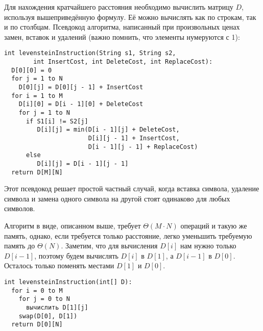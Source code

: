 Для нахождения кратчайшего расстояния необходимо вычислить матрицу $D$, используя вышеприведённую формулу.
Её можно вычислять как по строкам, так и по столбцам.
Псевдокод алгоритма, написанный при произвольных ценах замен, вставок и удалений (важно помнить, что элементы нумеруются с 1):

\begin{verbatim}
int levensteinInstruction(String s1, String s2, 
		int InsertCost, int DeleteCost, int ReplaceCost):
  D[0][0] = 0
  for j = 1 to N
    D[0][j] = D[0][j - 1] + InsertCost                  
  for i = 1 to M
    D[i][0] = D[i - 1][0] + DeleteCost                  
    for j = 1 to N
      if S1[i] != S2[j] 
         D[i][j] = min(D[i - 1][j] + DeleteCost,        
                       D[i][j - 1] + InsertCost,                      
                       D[i - 1][j - 1] + ReplaceCost)                 
      else 
         D[i][j] = D[i - 1][j - 1]
  return D[M][N]
\end{verbatim}

Этот псевдокод решает простой частный случай, когда вставка символа, удаление символа и замена одного символа на другой стоят одинаково для любых символов.

Алгоритм в виде, описанном выше, требует $\Theta(M \cdot N)$ операций и такую же память, однако, если требуется только расстояние, легко уменьшить требуемую память до $\Theta(N)$.
Заметим, что для вычисления $D[i]$ нам нужно только $D[i-1]$, поэтому будем вычислять $D[i]$ в $D[1]$, а $D[i-1]$ в $D[0]$.
Осталось только поменять местами $D[1]$ и $D[0]$.

\begin{verbatim}
int levensteinInstruction(int[] D):
  for i = 0 to M
    for j = 0 to N
      вычислить D[1][j]
    swap(D[0], D[1])
  return D[0][N]
\end{verbatim}
